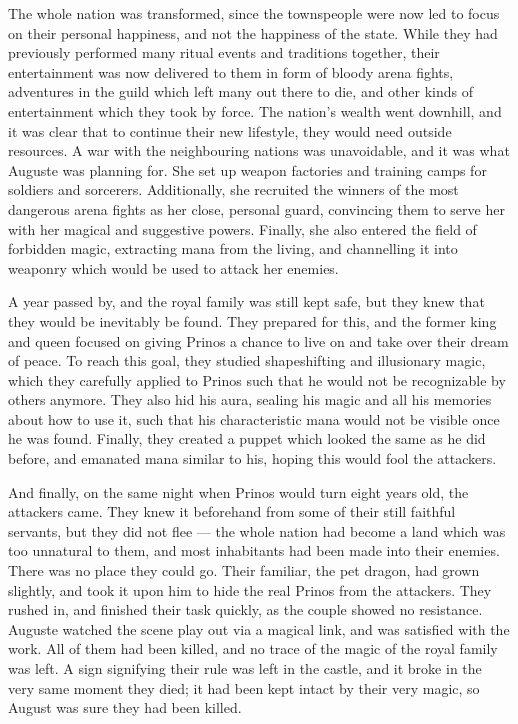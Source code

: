 \froufrou{}

The whole nation was transformed, since the townspeople were now led to focus on their personal happiness, and not the happiness of the state. While they had previously performed many ritual events and traditions together, their entertainment was now delivered to them in form of bloody arena fights, adventures in the guild which left many out there to die, and other kinds of entertainment which they took by force. The nation's wealth went downhill, and it was clear that to continue their new lifestyle, they would need outside resources. A war with the neighbouring nations was unavoidable, and it was what Auguste was planning for. She set up weapon factories and training camps for soldiers and sorcerers. Additionally, she recruited the winners of the most dangerous arena fights as her close, personal guard, convincing them to serve her with her magical and suggestive powers. Finally, she also entered the field of forbidden magic, extracting mana from the living, and channelling it into weaponry which would be used to attack her enemies.

A year passed by, and the royal family was still kept safe, but they knew that they would be inevitably be found. They prepared for this, and the former king and queen focused on giving Prinos a chance to live on and take over their dream of peace. To reach this goal, they studied shapeshifting and illusionary magic, which they carefully applied to Prinos such that he would not be recognizable by others anymore. They also hid his aura, sealing his magic and all his memories about how to use it, such that his characteristic mana would not be visible once he was found. Finally, they created a puppet which looked the same as he did before, and emanated mana similar to his, hoping this would fool the attackers.

And finally, on the same night when Prinos would turn eight years old, the attackers came. They knew it beforehand from some of their still faithful servants, but they did not flee --- the whole nation had become a land which was too unnatural to them, and most inhabitants had been made into their enemies. There was no place they could go. Their familiar, the pet dragon, had grown slightly, and took it upon him to hide the real Prinos from the attackers. They rushed in, and finished their task quickly, as the couple showed no resistance. Auguste watched the scene play out via a magical link, and was satisfied with the work. All of them had been killed, and no trace of the magic of the royal family was left. A sign signifying their rule was left in the castle, and it broke in the very same moment they died; it had been kept intact by their very magic, so August was sure they had been killed.

